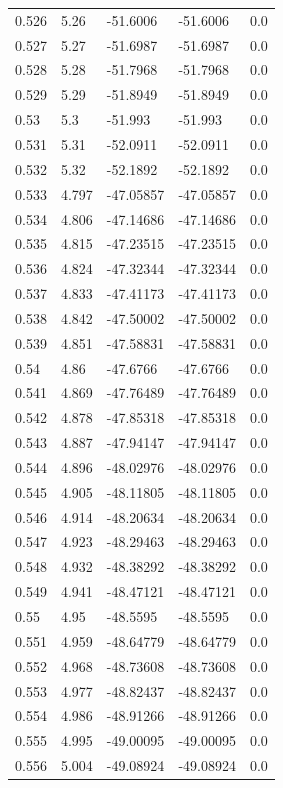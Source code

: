 \begin{tabular}{lllll}
0.526 & 5.26 & -51.6006 & -51.6006 & 0.0 \\
0.527 & 5.27 & -51.6987 & -51.6987 & 0.0 \\
0.528 & 5.28 & -51.7968 & -51.7968 & 0.0 \\
0.529 & 5.29 & -51.8949 & -51.8949 & 0.0 \\
0.53 & 5.3 & -51.993 & -51.993 & 0.0 \\
0.531 & 5.31 & -52.0911 & -52.0911 & 0.0 \\
0.532 & 5.32 & -52.1892 & -52.1892 & 0.0 \\
0.533 & 4.797 & -47.05857 & -47.05857 & 0.0 \\
0.534 & 4.806 & -47.14686 & -47.14686 & 0.0 \\
0.535 & 4.815 & -47.23515 & -47.23515 & 0.0 \\
0.536 & 4.824 & -47.32344 & -47.32344 & 0.0 \\
0.537 & 4.833 & -47.41173 & -47.41173 & 0.0 \\
0.538 & 4.842 & -47.50002 & -47.50002 & 0.0 \\
0.539 & 4.851 & -47.58831 & -47.58831 & 0.0 \\
0.54 & 4.86 & -47.6766 & -47.6766 & 0.0 \\
0.541 & 4.869 & -47.76489 & -47.76489 & 0.0 \\
0.542 & 4.878 & -47.85318 & -47.85318 & 0.0 \\
0.543 & 4.887 & -47.94147 & -47.94147 & 0.0 \\
0.544 & 4.896 & -48.02976 & -48.02976 & 0.0 \\
0.545 & 4.905 & -48.11805 & -48.11805 & 0.0 \\
0.546 & 4.914 & -48.20634 & -48.20634 & 0.0 \\
0.547 & 4.923 & -48.29463 & -48.29463 & 0.0 \\
0.548 & 4.932 & -48.38292 & -48.38292 & 0.0 \\
0.549 & 4.941 & -48.47121 & -48.47121 & 0.0 \\
0.55 & 4.95 & -48.5595 & -48.5595 & 0.0 \\
0.551 & 4.959 & -48.64779 & -48.64779 & 0.0 \\
0.552 & 4.968 & -48.73608 & -48.73608 & 0.0 \\
0.553 & 4.977 & -48.82437 & -48.82437 & 0.0 \\
0.554 & 4.986 & -48.91266 & -48.91266 & 0.0 \\
0.555 & 4.995 & -49.00095 & -49.00095 & 0.0 \\
0.556 & 5.004 & -49.08924 & -49.08924 & 0.0 \\

\end{tabular}
